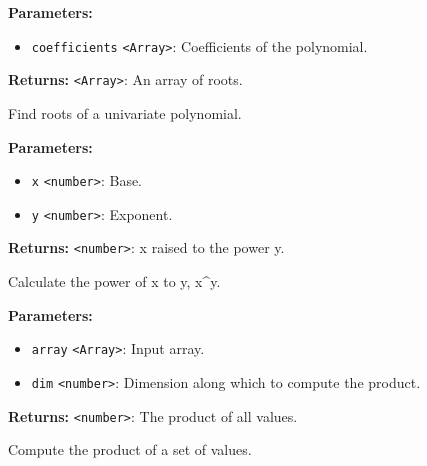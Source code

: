\documentclass[12pt,a4paper]{article}
\begin{document}
\vspace{5mm}
\noindent {}


\noindent \textbf{Parameters:}
\begin{itemize}
  \item \texttt{coefficients} \texttt{<Array>}: Coefficients of the polynomial.
\end{itemize}

\noindent \textbf{Returns:} \texttt{<Array>}: An array of roots.

\noindent Find roots of a univariate polynomial.

\vspace{5mm}
\noindent {}


\noindent \textbf{Parameters:}
\begin{itemize}
  \item \texttt{x} \texttt{<number>}: Base.
  \item \texttt{y} \texttt{<number>}: Exponent.
\end{itemize}

\noindent \textbf{Returns:} \texttt{<number>}: x raised to the power y.

\noindent Calculate the power of x to y, x\textasciicircum{}y.

\vspace{5mm}
\noindent {}


\noindent \textbf{Parameters:}
\begin{itemize}
  \item \texttt{array} \texttt{<Array>}: Input array.
  \item \texttt{dim} \texttt{<number>}: Dimension along which to compute the product.
\end{itemize}

\noindent \textbf{Returns:} \texttt{<number>}: The product of all values.

\noindent Compute the product of a set of values.

\vspace{5mm}
\noindent {}\vspace{4mm}
\end{document}
